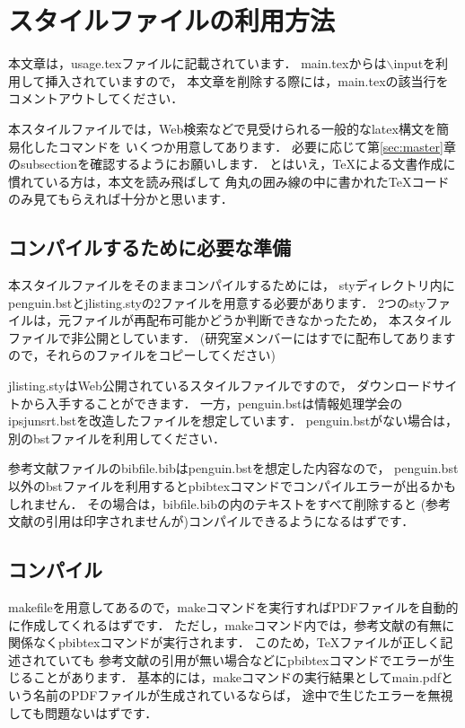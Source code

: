 %
%

\section{スタイルファイルの利用方法}
\label{sec:usage}

本文章は，usage.texファイルに記載されています．
main.texからは$\backslash$inputを利用して挿入されていますので，
本文章を削除する際には，main.texの該当行をコメントアウトしてください．

本スタイルファイルでは，Web検索などで見受けられる一般的なlatex構文を簡易化したコマンドを
いくつか用意してあります．
必要に応じて第\ref{sec:master}章のsubsectionを確認するようにお願いします．
とはいえ，TeXによる文書作成に慣れている方は，本文を読み飛ばして
角丸の囲み線の中に書かれたTeXコードのみ見てもらえれば十分かと思います．

\subsection{コンパイルするために必要な準備}
本スタイルファイルをそのままコンパイルするためには，
styディレクトリ内にpenguin.bstとjlisting.styの2ファイルを用意する必要があります．
2つのstyファイルは，元ファイルが再配布可能かどうか判断できなかったため，
本スタイルファイルで非公開としています．
(研究室メンバーにはすでに配布してありますので，それらのファイルをコピーしてください)

jlisting.styはWeb公開されているスタイルファイルですので，
ダウンロードサイトから入手することができます．
一方，penguin.bstは情報処理学会のipsjunsrt.bstを改造したファイルを想定しています．
penguin.bstがない場合は，別のbstファイルを利用してください．

参考文献ファイルのbibfile.bibはpenguin.bstを想定した内容なので，
penguin.bst以外のbstファイルを利用するとpbibtexコマンドでコンパイルエラーが出るかもしれません．
その場合は，bibfile.bibの内のテキストをすべて削除すると
(参考文献の引用は印字されませんが)コンパイルできるようになるはずです．
\subsection{コンパイル}
makefileを用意してあるので，makeコマンドを実行すればPDFファイルを自動的に作成してくれるはずです．
ただし，makeコマンド内では，参考文献の有無に関係なくpbibtexコマンドが実行されます．
このため，TeXファイルが正しく記述されていても
参考文献の引用が無い場合などにpbibtexコマンドでエラーが生じることがあります．
基本的には，makeコマンドの実行結果としてmain.pdfという名前のPDFファイルが生成されているならば，
途中で生じたエラーを無視しても問題ないはずです．

